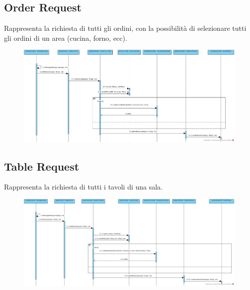 \subsection{Order Request}
Rappresenta la richiesta di tutti gli ordini, con la possibilità di selezionare tutti gli ordini di un area (cucina, forno, ecc).
 \begin{figure}[H]
	\centering
	\includegraphics[width=1\textwidth]{Immagini/top_orderRequest.jpg}
\end{figure}

\subsection{Table Request}
Rappresenta la richiesta di tutti i tavoli di una sala.
 \begin{figure}[H]
	\centering
	\includegraphics[width=1\textwidth]{Immagini/top_tableRequest.jpg}
\end{figure}